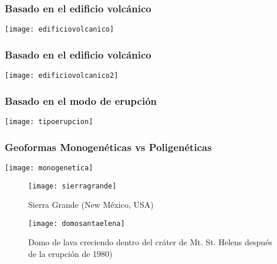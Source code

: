 \documentclass{beamer}
\begin{document}
\begin{frame}
\frametitle{Basado en el edificio volcánico}
\begin{center}
\texttt{[image: edificiovolcanico]}
\end{center}
\end{frame}
\begin{frame}
\frametitle{Basado en el edificio volcánico}
\begin{center}
\texttt{[image: edificiovolcanico2]}
\end{center}
\end{frame}
\begin{frame}
\frametitle{Basado en el modo de erupción}
\begin{center}
\texttt{[image: tipoerupcion]}
\end{center}
\end{frame}
\begin{frame}
\frametitle{Geoformas Monogenéticas vs Poligenéticas}
\begin{center}
\texttt{[image: monogenetica]}
\end{center}
\end{frame}
\begin{frame}
\begin{figure}
\begin{center}
\texttt{[image: sierragrande]}
\caption{Sierra Grande (New México, USA)}
\end{center}
\end{figure}
\end{frame}
\begin{frame}
\begin{figure}
\begin{center}
\texttt{[image: domosantaelena]}
\caption{Domo de lava creciendo dentro del cráter de Mt. St. Helens después de la erupción de 1980)}
\end{center}
\end{figure}
\end{frame}
\end{document}
